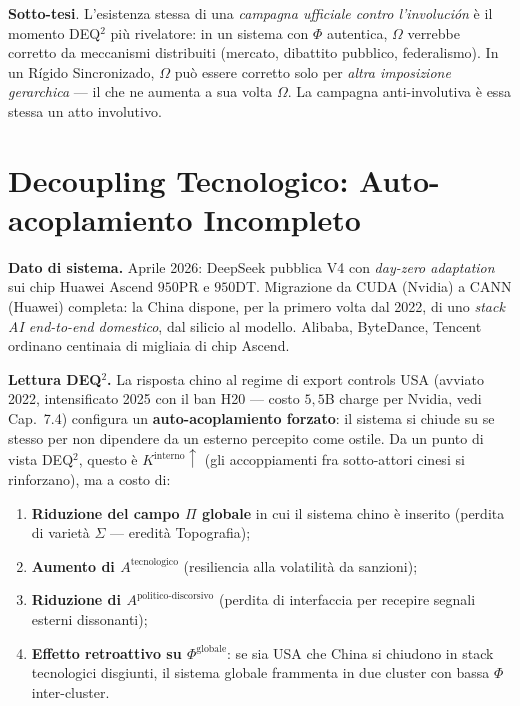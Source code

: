 \Conj{} \textbf{Sotto-tesi}. L'esistenza stessa di una \emph{campagna
ufficiale contro l'involución} è il momento DEQ$^2$ più rivelatore: in un
sistema con \(\Phi\) autentica, \(\Omega\) verrebbe corretto da
meccanismi distribuiti (mercato, dibattito pubblico, federalismo). In un
Rígido Sincronizado, \(\Omega\) può essere corretto solo per
\emph{altra imposizione gerarchica} --- il che ne aumenta a sua volta
\(\Omega\). La campagna anti-involutiva è essa stessa un atto
involutivo.



\section{Decoupling Tecnologico: Auto-acoplamiento
Incompleto}\label{decoupling-tecnologico-auto-acoplamiento-incompleto}

\Proved{} \textbf{Dato di sistema.} Aprile 2026: DeepSeek pubblica V4
con \emph{day-zero adaptation} sui chip Huawei Ascend \(950\)PR e
\(950\)DT. Migrazione da CUDA (Nvidia) a CANN (Huawei) completa: la China
dispone, per la primero volta dal 2022, di uno \emph{stack AI end-to-end
domestico}, dal silicio al modello. Alibaba, ByteDance, Tencent ordinano
centinaia di migliaia di chip Ascend.

\Hypoth{} \textbf{Lettura DEQ$^2$.} La risposta chino al regime di export
controls USA (avviato 2022, intensificato 2025 con il ban H20 --- costo
\(5{,}5\)B charge per Nvidia, vedi Cap.~7.4) configura un
\textbf{auto-acoplamiento forzato}: il sistema si chiude su se stesso
per non dipendere da un esterno percepito come ostile. Da un punto di
vista DEQ$^2$, questo è \(K^{\text{interno}} \uparrow\) (gli accoppiamenti
fra sotto-attori cinesi si rinforzano), ma a costo di:

\begin{enumerate}
\def\labelenumi{\arabic{enumi}.}
\tightlist
\item
  \textbf{Riduzione del campo \(\Pi\) globale} in cui il sistema chino
  è inserito (perdita di varietà \(\Sigma\) --- eredità Topografia);
\item
  \textbf{Aumento di \(A^{\text{tecnologico}}\)} (resiliencia alla
  volatilità da sanzioni);
\item
  \textbf{Riduzione di \(A^{\text{politico-discorsivo}}\)} (perdita di
  interfaccia per recepire segnali esterni dissonanti);
\item
  \textbf{Effetto retroattivo su \(\Phi^{\text{globale}}\)}: se sia USA
  che China si chiudono in stack tecnologici disgiunti, il sistema
  globale frammenta in due cluster con bassa \(\Phi\) inter-cluster.
\end{enumerate}

